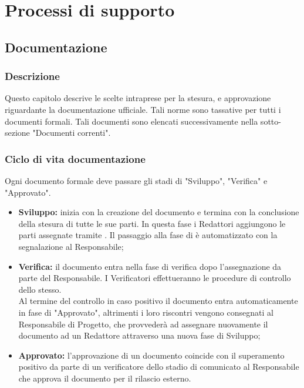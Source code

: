 \documentclass[NormeDiProgetto.tex]{subfiles}
\begin{document}
	
	
	\chapter{Processi di supporto}
	
	\section{Documentazione}
	\subsection{Descrizione}
	Questo capitolo descrive le scelte intraprese per la
	stesura,  e approvazione riguardante la documentazione ufficiale.
	Tali norme sono tassative per tutti i documenti formali.
	Tali documenti sono elencati successivamente nella sotto-sezione "Documenti correnti". 
	
	\subsection{Ciclo di vita documentazione}
	Ogni documento formale deve passare gli stadi di "Sviluppo", "Verifica" e "Approvato".
	\begin{itemize}
		\item \textbf{Sviluppo:} inizia con la creazione del documento e termina con la conclusione della stesura di tutte le sue parti. In questa fase i Redattori aggiungono le parti assegnate tramite .
		Il passaggio alla fase di  è automatizzato con la segnalazione al Responsabile;
		
		\item \textbf{Verifica:} il documento entra nella fase di verifica dopo l'assegnazione da parte del Responsabile. I Verificatori effettueranno le procedure di controllo dello stesso.\\
		Al termine del controllo in caso positivo il documento entra automaticamente in fase di "Approvato", altrimenti i loro riscontri vengono consegnati al Responsabile di Progetto, che provvederà ad assegnare nuovamente il documento ad un Redattore attraverso una nuova fase di Sviluppo; 
		
		\item \textbf{Approvato:} l'approvazione di un documento coincide con il superamento positivo da parte di un verificatore dello stadio di  comunicato al Responsabile che approva il documento per il rilascio esterno.
	\end{itemize}
	
\end{document}
